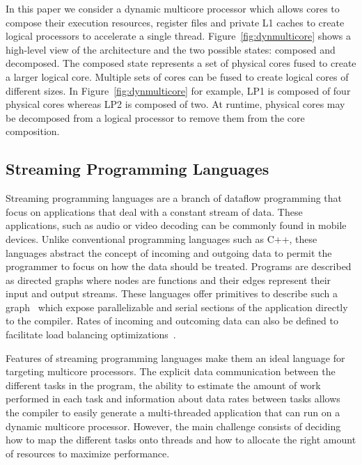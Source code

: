 In this paper we consider a dynamic multicore processor which allows cores to compose their execution resources, register files and private L1 caches to create logical processors to accelerate a single thread.
Figure~\ref{fig:dynmulticore} shows a high-level view of the architecture and the two possible states: composed and decomposed.
The composed state represents a set of physical cores fused to create a larger logical core.
Multiple sets of cores can be fused to create logical cores of different sizes.
In Figure~\ref{fig:dynmulticore} for example, LP1 is composed of four physical cores whereas LP2 is composed of two.
At runtime, physical cores may be decomposed from a logical processor to remove them from the core composition.

\vspace{10mm}
\subsection{Streaming Programming Languages}


Streaming programming languages are a branch of dataflow programming that focus on applications that deal with a constant stream of data.
These applications, such as audio or video decoding can be commonly found in mobile devices.
Unlike conventional programming languages such as C++, these languages abstract the concept of incoming and outgoing data to permit the programmer to focus on how the data should be treated.
Programs are described as directed graphs where nodes are functions and their edges represent their input and output streams. 
These languages offer primitives to describe such a graph~\cite{theis2002streamit} which expose parallelizable and serial sections of the application directly to the compiler. 
Rates of incoming and outcoming data can also be defined to facilitate load balancing optimizations~\cite{chen2005rawstream}.

Features of streaming programming languages make them an ideal language for targeting multicore processors.
The explicit data communication between the different tasks in the program, the ability to estimate the amount of work performed in each task and information about data rates between tasks allows the compiler to easily generate a multi-threaded application that can run on a dynamic multicore processor.
However, the main challenge consists of deciding how to map the different tasks onto threads and how to allocate the right amount of resources to maximize performance.

